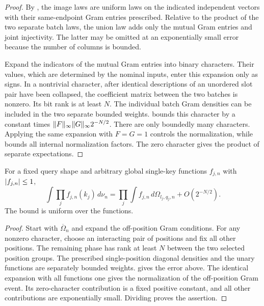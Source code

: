 \begin{proof}
By , the image laws are uniform laws on the
indicated independent vectors with their same-endpoint Gram entries
prescribed. Relative to the product of the two separate batch laws,
the union law adds only the mutual Gram entries and joint injectivity.
The latter may be omitted at an exponentially small error because the
number of columns is bounded.

Expand the indicators of the mutual Gram entries into binary
characters. Their values, which are determined by the nominal inputs,
enter this expansion only as signs. In a nontrivial character, after
identical descriptions of an unordered slot pair have been collapsed,
the coefficient matrix between the two batches is nonzero. Its bit
rank is at least $N$. The individual batch Gram densities can be
included in the two separate bounded weights.  bounds
this character by a constant times
$\lVert F\rVert_\infty\lVert G\rVert_\infty2^{-N/2}$.
There are only boundedly many characters. Applying the same expansion
with $F=G=1$ controls the normalization, while
 bounds all internal normalization
factors. The zero character gives the product of separate expectations.
\end{proof}

\begin{lemma}
\label{lem:reference-product}
For a fixed query shape and arbitrary global single-key functions
$f_{j,n}$ with $\lvert f_{j,n}\rvert\le1$,
\[
 \int\prod_jf_{j,n}(k_j)\,d\nu_n
 =\prod_j\int f_{j,n}\,d\Omega_{l_j,q_j,n}
   +O(2^{-N/2}).
\]
The bound is uniform over the functions.
\end{lemma}

\begin{proof}
Start with $\overline\Omega_n$ and expand the off-position Gram
conditions. For any nonzero character, choose an interacting pair of
positions and fix all other positions. The remaining phase has rank
at least $N$ between the two selected position groups. The prescribed
single-position diagonal densities and the unary functions are
separately bounded weights.  gives the error above.
The identical expansion with all functions one gives the normalization
of the off-position Gram event. Its zero-character contribution is a
fixed positive constant, and all other contributions are exponentially
small. Dividing proves the assertion.
\end{proof}

